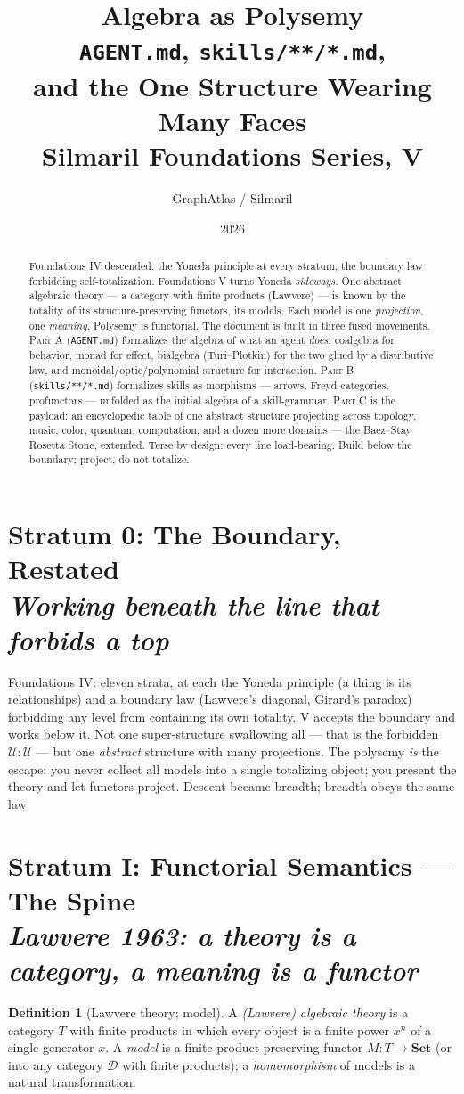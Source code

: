 \documentclass[11pt]{article}
\title{\color{silmaril}\textbf{Algebra as Polysemy}\\[0.5ex]
\large \texttt{AGENT.md}, \texttt{skills/**/*.md},\\ and the One Structure Wearing Many Faces\\[0.3ex]
\normalsize Silmaril Foundations Series, V}
\author{GraphAtlas / Silmaril}
\date{2026}
\theoremstyle{plain}
\theoremstyle{definition}
\newtheorem{definition}[theorem]{Definition}
\theoremstyle{remark}
\newcommand{\D}{\mathcal{D}}
\newcommand{\Set}{\mathbf{Set}}
\newcommand{\stratum}[2]{\section{#1\\ {\normalsize\normalfont\itshape #2}}}
\begin{document}
\maketitle

\begin{abstract}
\noindent Foundations IV descended: the Yoneda principle at every stratum, the boundary law forbidding self-totalization. Foundations V turns Yoneda \emph{sideways}. One abstract algebraic theory --- a category with finite products (Lawvere) --- is known by the totality of its structure-preserving functors, its models. Each model is one \emph{projection}, one \emph{meaning}. Polysemy is functorial. The document is built in three fused movements. \textsc{Part A} (\texttt{AGENT.md}) formalizes the algebra of what an agent \emph{does}: coalgebra for behavior, monad for effect, bialgebra (Turi--Plotkin) for the two glued by a distributive law, and monoidal/optic/polynomial structure for interaction. \textsc{Part B} (\texttt{skills/**/*.md}) formalizes skills as morphisms --- arrows, Freyd categories, profunctors --- unfolded as the initial algebra of a skill-grammar. \textsc{Part C} is the payload: an encyclopedic table of one abstract structure projecting across topology, music, color, quantum, computation, and a dozen more domains --- the Baez--Stay Rosetta Stone, extended. Terse by design: every line load-bearing. Build below the boundary; project, do not totalize.
\end{abstract}

{\small\tableofcontents}
\newpage

\stratum{Stratum 0: The Boundary, Restated}{Working beneath the line that forbids a top}

Foundations IV: eleven strata, at each the Yoneda principle (a thing is its relationships) and a boundary law (Lawvere's diagonal, Girard's paradox) forbidding any level from containing its own totality. V accepts the boundary and works below it. Not one super-structure swallowing all --- that is the forbidden $\mathcal{U}:\mathcal{U}$ --- but one \emph{abstract} structure with many projections. The polysemy \emph{is} the escape: you never collect all models into a single totalizing object; you present the theory and let functors project. Descent became breadth; breadth obeys the same law.

\stratum{Stratum I: Functorial Semantics --- The Spine}{Lawvere 1963: a theory is a category, a meaning is a functor}

\begin{definition}[Lawvere theory; model]
A \emph{(Lawvere) algebraic theory} is a category $T$ with finite products in which every object is a finite power $x^n$ of a single generator $x$. A \emph{model} is a finite-product-preserving functor $M\colon T \to \Set$ (or into any category $\D$ with finite products); a \emph{homomorphism} of models is a natural transformation.
\end{definition}
\end{document}
